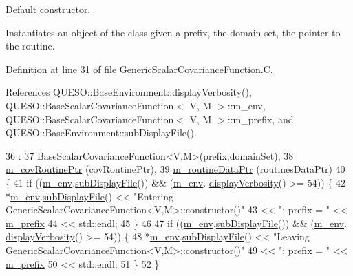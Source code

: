 Default constructor. 

Instantiates an object of the class given a prefix, the domain set, the pointer to the routine. 

Definition at line 31 of file Generic\-Scalar\-Covariance\-Function.\-C.



References Q\-U\-E\-S\-O\-::\-Base\-Environment\-::display\-Verbosity(), Q\-U\-E\-S\-O\-::\-Base\-Scalar\-Covariance\-Function$<$ V, M $>$\-::m\-\_\-env, Q\-U\-E\-S\-O\-::\-Base\-Scalar\-Covariance\-Function$<$ V, M $>$\-::m\-\_\-prefix, and Q\-U\-E\-S\-O\-::\-Base\-Environment\-::sub\-Display\-File().


\begin{DoxyCode}
36   : 
37   BaseScalarCovarianceFunction<V,M>(prefix,domainSet),
38   \hyperlink{class_q_u_e_s_o_1_1_generic_scalar_covariance_function_a5ab019180d841614bc6c6c957be91f93}{m\_covRoutinePtr}                         (covRoutinePtr),
39   \hyperlink{class_q_u_e_s_o_1_1_generic_scalar_covariance_function_ac09d3c5de0ca3e00e2ee16f7654c8da6}{m\_routineDataPtr}                        (routinesDataPtr)
40 \{
41   \textcolor{keywordflow}{if} ((\hyperlink{class_q_u_e_s_o_1_1_base_scalar_covariance_function_a2a100016b480c498b5219fb937d62543}{m\_env}.\hyperlink{class_q_u_e_s_o_1_1_base_environment_a8a0064746ae8dddfece4229b9ad374d6}{subDisplayFile}()) && (\hyperlink{class_q_u_e_s_o_1_1_base_scalar_covariance_function_a2a100016b480c498b5219fb937d62543}{m\_env}.
      \hyperlink{class_q_u_e_s_o_1_1_base_environment_a1fe5f244fc0316a0ab3e37463f108b96}{displayVerbosity}() >= 54)) \{
42     *\hyperlink{class_q_u_e_s_o_1_1_base_scalar_covariance_function_a2a100016b480c498b5219fb937d62543}{m\_env}.\hyperlink{class_q_u_e_s_o_1_1_base_environment_a8a0064746ae8dddfece4229b9ad374d6}{subDisplayFile}() << \textcolor{stringliteral}{"Entering
       GenericScalarCovarianceFunction<V,M>::constructor()"}
43                             << \textcolor{stringliteral}{": prefix = "} << \hyperlink{class_q_u_e_s_o_1_1_base_scalar_covariance_function_a21636873436b88cb77075c6edbd61c71}{m\_prefix}
44                             << std::endl;
45   \}
46 
47   \textcolor{keywordflow}{if} ((\hyperlink{class_q_u_e_s_o_1_1_base_scalar_covariance_function_a2a100016b480c498b5219fb937d62543}{m\_env}.\hyperlink{class_q_u_e_s_o_1_1_base_environment_a8a0064746ae8dddfece4229b9ad374d6}{subDisplayFile}()) && (\hyperlink{class_q_u_e_s_o_1_1_base_scalar_covariance_function_a2a100016b480c498b5219fb937d62543}{m\_env}.
      \hyperlink{class_q_u_e_s_o_1_1_base_environment_a1fe5f244fc0316a0ab3e37463f108b96}{displayVerbosity}() >= 54)) \{
48     *\hyperlink{class_q_u_e_s_o_1_1_base_scalar_covariance_function_a2a100016b480c498b5219fb937d62543}{m\_env}.\hyperlink{class_q_u_e_s_o_1_1_base_environment_a8a0064746ae8dddfece4229b9ad374d6}{subDisplayFile}() << \textcolor{stringliteral}{"Leaving
       GenericScalarCovarianceFunction<V,M>::constructor()"}
49                             << \textcolor{stringliteral}{": prefix = "} << \hyperlink{class_q_u_e_s_o_1_1_base_scalar_covariance_function_a21636873436b88cb77075c6edbd61c71}{m\_prefix}
50                             << std::endl;
51   \}
52 \}
\end{DoxyCode}
